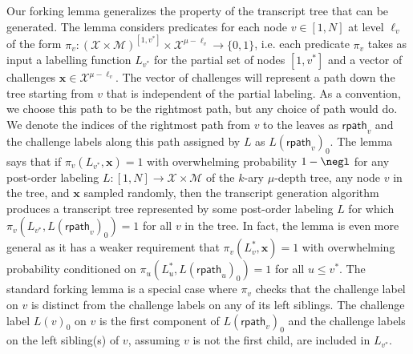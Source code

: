  Our forking lemma generalizes the property of the transcript tree that can be generated. The lemma considers predicates for each node $v \in [1,N]$ at level $\ell_v$ of the form $\pi_v: (\mathcal{X}\times \mathcal{M})^{[1,v^*]} \times \mathcal{X}^{\mu - \ell_v} \rightarrow \{0,1\}$, i.e. each predicate $\pi_v$ takes as input a labelling function $L_{v^*}$ for the partial set of nodes $[1,v^*]$ and a vector of challenges $\mathbf{x} \in \mathcal{X}^{\mu - \ell_v}$. The vector of challenges will represent a path down the tree starting from $v$ that is independent of the partial labeling. As a convention, we choose this path to be the rightmost path, but any choice of path would do. We denote the indices of the rightmost path from $v$ to the leaves as $\textsf{rpath}_v$ and the challenge labels along this path assigned by $L$ as $L(\textsf{rpath}_v)_0$. The lemma says that if $\pi_v(L_{v^*}, \mathbf{x}) = 1$ with overwhelming probability $1 - \negl$ for any post-order labeling $L:[1,N] \rightarrow \mathcal{X} \times \mathcal{M}$ of the $k$-ary $\mu$-depth tree, any node $v$ in the tree, and $\mathbf{x}$ sampled randomly, then the transcript generation algorithm produces a transcript tree represented by some post-order labeling $L$ for which $\pi_v(L_{v^*}, L(\textsf{rpath}_v)_0) = 1$ for all $v$ in the tree. In fact, the lemma is even more general as it has a weaker requirement that $\pi_v(L_v^*, \mathbf{x}) = 1$ with overwhelming probability conditioned on $\pi_u(L_u^*, L(\textsf{rpath}_u)_0) = 1$ for all $u \leq v^*$. The standard forking lemma is a special case where $\pi_v$ checks that the challenge label on $v$ is distinct from the challenge labels on any of its left siblings. The challenge label $L(v)_0$ on $v$ is the first component of $L(\textsf{rpath}_v)_0$ and the challenge labels on the left sibling(s) of $v$, assuming $v$ is not the first child, are included in $L_{v^*}$. 
 

